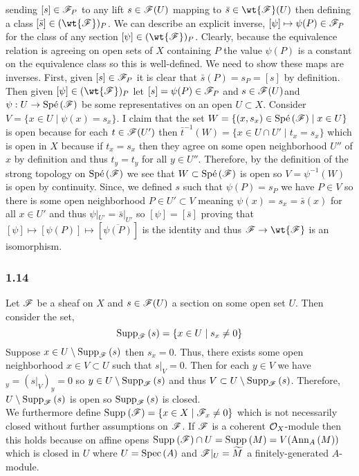 \documentclass[12pt]{article}
\begin{document}
sending $[s] \in \mathscr{F}_P$ to any lift $s \in \mathscr{F}(U)$ mapping to $\bar{s} \in \wt{\F}(U)$ then defining a class $[\bar{s}] \in (\wt{\F})_P$. We can describe an explicit inverse, $[\psi] \mapsto \psi(P) \in \mathscr{F}_P$ for the class of any section $[\psi] \in (\wt{\F})_P$. Clearly, because the equivalence relation is agreeing on open sets of $X$ containing $P$ the value $\psi(P)$ is a constant on the equivalence class so this is well-defined. We need to show these maps are inverses. First, given $[s] \in \mathscr{F}_P$ it is clear that $\bar{s}(P) = s_P = [s]$ by definition. Then given $[\psi] \in (\wt{\F})_P$ let $[s] = \psi(P) \in \mathscr{F}_P$ and $s \in \mathscr{F}(U)$and $\psi : U \to \text{Sp\'{e}}\left( \mathscr{F} \right)$ be some representatives on an open $U \subset X$. Consider $V = \{ x \in U \mid \psi(x) = s_{x} \}$. I claim that the set $W = \{ (x, s_x) \in \text{Sp\'{e}}\left( \mathscr{F} \right) \mid x \in U \}$ is open because for each $t \in \mathscr{F}(U')$ then $\bar{t}^{-1}(W) = \{ x \in U \cap U' \mid t_x = s_x \}$ which is open in $X$ because if $t_x = s_x$ then they agree on some open neighborhood $U''$ of $x$ by definition and thus $t_y = t_y$ for all $y \in U''$. Therefore, by the definition of the strong topology on $\text{Sp\'{e}}\left( \mathscr{F} \right)$ we see that $W \subset \text{Sp\'{e}}\left( \mathscr{F} \right)$ is open so $V = \psi^{-1}(W)$ is open by continuity. Since, we defined $s$ such that $\psi(P) = s_P$ we have $P \in V$ so there is some open neighborhood $P \in U' \subset V$ meaning $\psi(x) = s_x = \bar{s}(x)$ for all $x \in U'$ and thus $\psi|_{U'} = \bar{s}|_{U'}$ so $[\psi] = [\bar{s}]$ proving that $[\psi] \mapsto [\psi(P)] \mapsto [\overline{\psi(P)}]$ is the identity and thus $\F \to \wt{\F}$ is an isomorphism.

\subsubsection{1.14}

Let $\mathscr{F}$ be a sheaf on $X$ and $s \in \mathscr{F}(U)$ a section on some open set $U$. Then consider the set,
\[ \mathrm{Supp}_{\mathscr{F}}\left(s \right) = \{ x \in U \mid s_x \neq 0 \} \]
Suppose $x \in U \setminus \mathrm{Supp}_{\mathscr{F}}\left(s \right)$ then $s_x = 0$. Thus, there exists some open neighborhood $x \in V \subset U$ such that $s|_V = 0$. Then for each $y \in V$ we have $_y = (s|_V)_y = 0$ so $y \in U \setminus \mathrm{Supp}_{\mathscr{F}}\left(s \right)$ and thus $V \subset U \setminus \mathrm{Supp}_{\mathscr{F}}\left(s \right)$. Therefore, $U \setminus \mathrm{Supp}_{\mathscr{F}}\left(s \right)$ is open so $\mathrm{Supp}_{\mathscr{F}}\left(s \right)$ is closed.
\bigskip\\
We furthermore define $\mathrm{Supp}_{}\left(\mathscr{F} \right) = \{ x \in X \mid \mathscr{F}_x \neq 0 \}$ which is not necessarily closed without further assumptions on $\mathscr{F}$. If $\mathscr{F}$ is a coherent $\mathcal{O}_{X}$-module then this holds because on affine opens $\mathrm{Supp}_{}\left(\mathscr{F} \right) \cap U = \mathrm{Supp}_{}\left(M \right) = V(\mathrm{Ann}_{A}\left(M\right))$ which is closed in $U$ where $U = \mathrm{Spec}\left( A \right)$ and $\mathscr{F} |_U = \widetilde{M}$ a finitely-generated $A$-module. 
\end{document}
